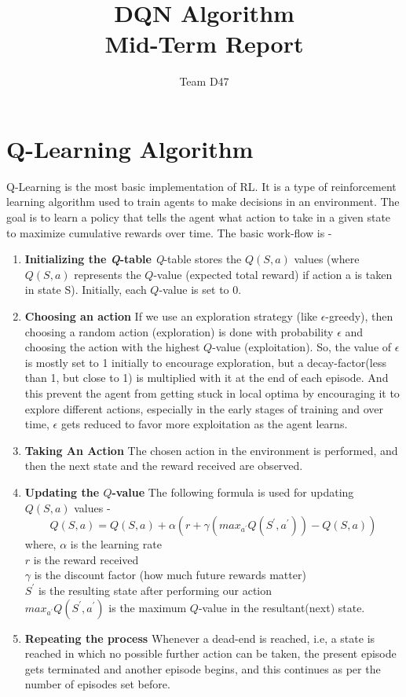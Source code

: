 \documentclass{report}
\title{DQN Algorithm \\
Mid-Term Report}
\author{Team D47}
\begin{document}
\maketitle
\section*{Q-Learning Algorithm}
Q-Learning is the most basic implementation of RL. It is a type of reinforcement learning algorithm used to train agents to make decisions in an environment. The goal is to learn a policy that tells the agent what action to take in a given state to maximize cumulative rewards over time.
The basic work-flow is - 
\begin{enumerate}
    \item \textbf{Initializing the \textit{Q}-table} \textit{Q}-table stores the $Q(S,a)$ values (where $Q(S,a)$ represents the $Q$-value (expected total reward) if action a is taken in state S). Initially, each $Q$-value is set to 0.
    \item \textbf{Choosing an action} If we use an exploration strategy (like $\epsilon$-greedy), then choosing a random action (exploration) is done with probability $\epsilon$ and choosing the action with the highest $Q$-value (exploitation). So, the value of $\epsilon$ is mostly set to 1 initially to encourage exploration, but a decay-factor(less than 1, but close to 1) is multiplied with it at the end of each episode. And this prevent the agent from getting stuck in local optima by encouraging it to explore different actions, especially in the early stages of training and over time, $\epsilon$ gets reduced to favor more exploitation as the agent learns.
    \item \textbf{Taking An Action} The chosen action in the environment is performed, and then the next state and the reward received are observed.
    \item \textbf{Updating the $Q$-value} The following formula is used for updating $Q(S,a)$ values -
    \[Q(S,a) = Q(S,a) + \alpha(r + \gamma(max_{a^\prime}Q(S^\prime, a^\prime)) - Q(S,a))\]
    where, $\alpha$ is the learning rate \\ $r$ is the reward received \\ $\gamma$ is the discount factor (how much future rewards matter) \\ $S^\prime$ is the resulting state after performing our action \\ $max_{a^\prime}Q(S^\prime, a^\prime)$ is the maximum $Q$-value in the resultant(next) state.
    \item \textbf{Repeating the process} Whenever a dead-end is reached, i.e, a state is reached in which no possible further action can be taken, the present episode gets terminated and another episode begins, and this continues as per the number of episodes set before.
\end{enumerate}
\end{document}
